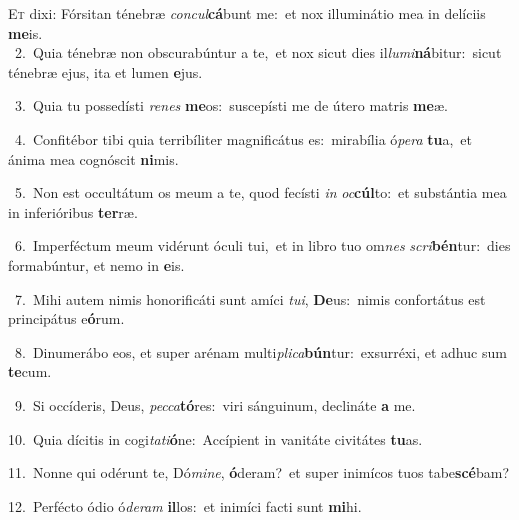 \lettrine{\initial\textcolor{\initialcolor}{E}}{t} dixi: Fórsitan ténebræ \textit{con}\-\textit{cul}\textbf{cá}bunt me:~\star et nox illuminátio mea in delíciis \textbf{me}\-is.\\
{\numbfont\textcolor{\numbcolor}{~2.}}~Quia ténebræ non obscurabúntur a te,~\dagger et nox sicut dies il\-\textit{lu}\-\textit{mi}\textbf{ná}bitur:~\star sicut ténebræ ejus, ita et lumen \textbf{e}\-jus.\par
{\numbfont\textcolor{\numbcolor}{~3.}}~Quia tu possedísti \textit{re}\-\textit{nes} \textbf{me}\-os:~\star suscepísti me de útero matris \textbf{me}\-æ.\par
{\numbfont\textcolor{\numbcolor}{~4.}}~Confitébor tibi quia terribíliter magnificátus es:~\dagger mirabília ó\-\textit{pe}\-\textit{ra} \textbf{tu}\-a,~\star et ánima mea cognóscit \textbf{ni}\-mis.\par
{\numbfont\textcolor{\numbcolor}{~5.}}~Non est occultátum os meum a te, quod fecísti \textit{in} \textit{oc}\-\textbf{cúl}to:~\star et substántia mea in inferióribus \textbf{ter}\-ræ.\par
{\numbfont\textcolor{\numbcolor}{~6.}}~Imperféctum meum vidérunt óculi tui,~\dagger et in libro tuo om\textit{nes} \textit{scri}\-\textbf{bén}tur:~\star dies formabúntur, et nemo in \textbf{e}\-is.\par
{\numbfont\textcolor{\numbcolor}{~7.}}~Mihi autem nimis honorificáti sunt amíci \textit{tu}\-\textit{i}, \textbf{De}\-us:~\star nimis confortátus est principátus e\-\textbf{ó}\-rum.\par
{\numbfont\textcolor{\numbcolor}{~8.}}~Dinumerábo eos, et super arénam multi\-\textit{pli}\-\textit{ca}\textbf{bún}tur:~\star exsurréxi, et adhuc sum \textbf{te}\-cum.\par
{\numbfont\textcolor{\numbcolor}{~9.}}~Si occíderis, Deus, \textit{pec}\-\textit{ca}\textbf{tó}res:~\star viri sánguinum, declináte \textbf{a} me.\par
{\numbfont\textcolor{\numbcolor}{10.}}~Quia dícitis in cogi\-\textit{ta}\-\textit{ti}\textbf{ó}ne:~\star Accípient in vanitáte civitátes \textbf{tu}\-as.\par
{\numbfont\textcolor{\numbcolor}{11.}}~Nonne qui odérunt te, Dó\-\textit{mi}\-\textit{ne}, \textbf{ó}\-deram?~\star et super inimícos tuos tabe\-\textbf{scé}\-bam?\par
{\numbfont\textcolor{\numbcolor}{12.}}~Perfécto ódio ó\-\textit{de}\-\textit{ram} \textbf{il}\-los:~\star et inimíci facti sunt \textbf{mi}\-hi.\par
